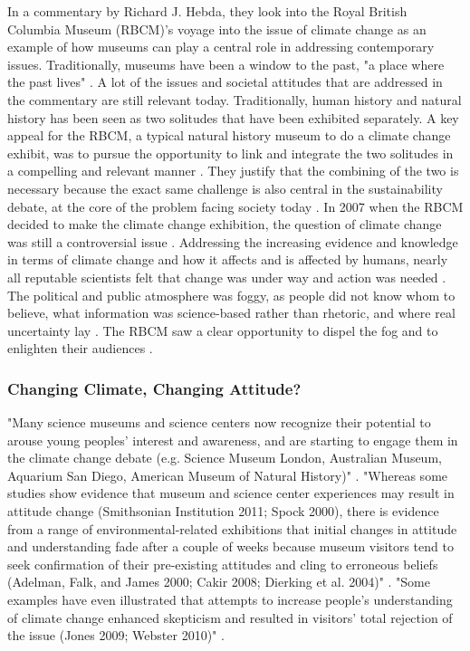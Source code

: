In a commentary by Richard J. Hebda, they look into the Royal British Columbia Museum (RBCM)’s voyage into the issue of climate change as an example of how museums can play a central role in addressing contemporary issues. Traditionally, museums have been a window to the past, "a place where the past lives" \autocite[p. 1]{hebda_article}. A lot of the issues and societal attitudes that are addressed in the commentary are still relevant today. Traditionally, human history and natural history has been seen as two solitudes that have been exhibited separately. A key appeal for the RBCM, a typical natural history museum to do a climate change exhibit, was to pursue the opportunity to link and integrate the two solitudes in a compelling and relevant manner \autocite[p. 2]{hebda_article}. They justify that the combining of the two is necessary because the exact same challenge is also central in the sustainability debate, at the core of the problem facing society today \autocite[p.2]{hebda_article}. In 2007 when the RBCM decided to make the climate change exhibition, the question of climate change was still a controversial issue \autocite[p.2]{hebda_article}. Addressing the increasing evidence and knowledge in terms of climate change and how it affects and is affected by humans, nearly all reputable scientists felt that change was under way and action was needed \autocite[p.2]{hebda_article}. The political and public atmosphere was foggy, as people did not know whom to believe, what information was science-based rather than rhetoric, and where real uncertainty lay \autocite[p.2]{hebda_article}. The RBCM saw a clear opportunity to dispel the fog and to enlighten their audiences \autocite[p.2]{hebda_article}.

\subsubsection{Changing Climate, Changing Attitude?}

"Many science museums and science centers now recognize their potential to arouse young peoples’ interest and awareness, and are starting to engage them in the climate change debate (e.g. Science Museum London, Australian Museum, Aquarium San Diego, American Museum of Natural History)" \autocite[p. 95]{gorr_changing_2014}. "Whereas some studies show evidence that museum and science center experiences may result in attitude change (Smithsonian Institution 2011; Spock 2000), there is evidence from a range of environmental-related exhibitions that initial changes in attitude and understanding fade after a couple of weeks because museum visitors tend to seek confirmation of their pre-existing attitudes and cling to erroneous beliefs (Adelman, Falk, and James 2000; Cakir 2008; Dierking et al. 2004)" \autocite[p. 95]{gorr_changing_2014}. "Some examples have even illustrated that attempts to increase people’s understanding of climate change enhanced skepticism and resulted in visitors’ total rejection of the issue (Jones 2009; Webster 2010)" \autocite[p. 96]{gorr_changing_2014}.

